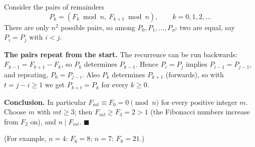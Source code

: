 Consider the pairs of remainders
\[
P_k=\left(F_k\bmod n,\ F_{k+1}\bmod n\right),\qquad k=0,1,2,\dots
\]
There are only $n^2$ possible pairs, so among $P_0,P_1,\dots,P_{n^2}$ two are equal, say $P_i=P_j$ with $i<j$.

\textbf{The pairs repeat from the start.} The recurrence can be run backwards: $F_{k-1}=F_{k+1}-F_k$, so $P_k$ determines $P_{k-1}$. Hence $P_i=P_j$ implies $P_{i-1}=P_{j-1}$, and repeating, $P_0=P_{j-i}$. Also $P_k$ determines $P_{k+1}$ (forwards), so with $t=j-i\ge1$ we get $P_{k+t}=P_k$ for every $k\ge0$.

\textbf{Conclusion.} In particular $F_{mt}\equiv F_0=0\pmod n$ for every positive integer $m$. Choose $m$ with $mt\ge3$; then $F_{mt}\ge F_3=2>1$ (the Fibonacci numbers increase from $F_2$ on), and $n\mid F_{mt}$. $\blacksquare$

(For example, $n=4$: $F_6=8$; $n=7$: $F_8=21$.)
